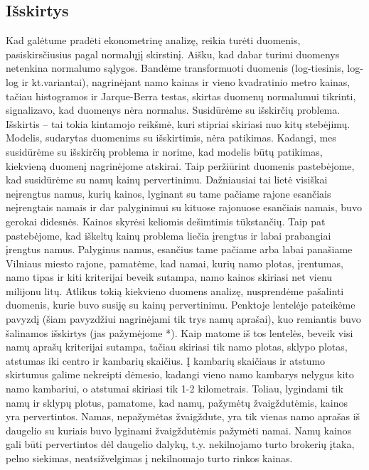 \documentclass[a4paper]{article}
\begin{document}
\subsection{Išskirtys}
\hspace*{0,52cm}Kad galėtume pradėti ekonometrinę analizę, reikia turėti duomenis, pasiskirsčiusius pagal normalųjį skirstinį. Aišku, kad dabar turimi duomenys netenkina normalumo sąlygos. Bandėme transformuoti duomenis (log-tiesinis, log-log ir kt.variantai), nagrinėjant namo kainas ir vieno kvadratinio metro kainas, tačiau histogramos ir Jarque-Berra testas, skirtas duomenų normalumui tikrinti, signalizavo, kad duomenys nėra normalus. Susidūrėme su išskirčių problema.\\
\hspace*{0,52cm}Išskirtis -- tai tokia kintamojo reikšmė, kuri stipriai skiriasi nuo kitų stebėjimų. Modelis, sudarytas duomenims su išskirtimis, nėra patikimas. Kadangi, mes susidūrėme su išskirčių problema ir norime, kad modelis būtų patikimas, kiekvieną duomenį nagrinėjome atskirai. Taip peržiūrint duomenis pastebėjome, kad susidūrėme su namų kainų pervertinimu. Dažniausiai tai lietė visiškai neįrengtus namus, kurių kainos, lyginant su tame pačiame rajone esančiais neįrengtais namais ir dar palyginimui su kituose rajonuose esančiais namais, buvo gerokai didesnės. Kainos skyrėsi keliomis dešimtimis tūkstančių. Taip pat pastebėjome, kad iškeltų kainų problema liečia įrengtus ir labai prabangiai įrengtus namus. Palyginus namus, esančius tame pačiame arba labai panašiame Vilniaus miesto rajone, pamatėme, kad namai, kurių namo plotas, įrentumas, namo tipas ir kiti kriterijai beveik sutampa, namo kainos skiriasi net vienu milijonu litų. Atlikus tokią kiekvieno duomens analizę, nusprendėme pašalinti duomenis, kurie buvo susiję su kainų pervertinimu. Penktoje lentelėje pateikėme pavyzdį (šiam pavyzdžiui nagrinėjami tik trys namų aprašai), kuo remiantis buvo šalinamos išskirtys (jas pažymėjome *). Kaip matome iš tos lentelės, beveik visi namų aprašų kriterijai sutampa, tačiau skiriasi tik namo plotas, sklypo plotas, atstumas iki centro ir kambarių skaičius. Į kambarių skaičiaus ir atstumo skirtumus galime nekreipti dėmesio, kadangi vieno namo kambarys nelygus kito namo kambariui, o  atstumai skiriasi tik 1-2 kilometrais. Toliau, lygindami tik namų ir sklypų plotus, pamatome, kad namų, pažymėtų žvaigždutėmis, kainos yra pervertintos. Namas, nepažymėtas žvaigždute, yra tik vienas namo aprašas iš daugelio su kuriais buvo lyginami žvaigždutėmis pažymėti namai. Namų kainos gali būti pervertintos dėl daugelio dalykų, t.y. nekilnojamo turto brokerių įtaka, pelno siekimas, neatsižvelgimas į nekilnomajo turto rinkos kainas.
\end{document}
